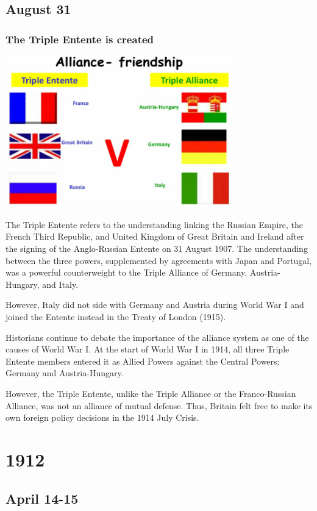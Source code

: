 \documentclass[11pt]{report}
\begin{document}
\section{August 31}
\subsection{The Triple Entente is created}
\vspace{2mm}\begin{center}\includegraphics[width=10cm]{./img/tripleEntente.png}\end{center}
The Triple Entente refers to the understanding linking the Russian Empire, the French Third Republic, and United Kingdom of Great Britain and Ireland after the signing of the Anglo-Russian Entente on 31 August 1907. The understanding between the three powers, supplemented by agreements with Japan and Portugal, was a powerful counterweight to the Triple Alliance of Germany, Austria-Hungary, and Italy.

However, Italy did not side with Germany and Austria during World War I and joined the Entente instead in the Treaty of London (1915).

Historians continue to debate the importance of the alliance system as one of the causes of World War I. At the start of World War I in 1914, all three Triple Entente members entered it as Allied Powers against the Central Powers: Germany and Austria-Hungary.

However, the Triple Entente, unlike the Triple Alliance or the Franco-Russian Alliance, was not an alliance of mutual defense. Thus, Britain felt free to make its own foreign policy decisions in the 1914 July Crisis.

\chapter{1912}
\section{April 14-15}
\end{document}
